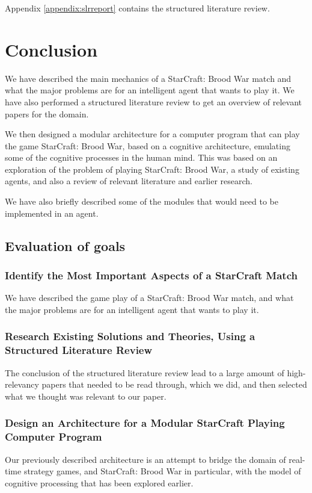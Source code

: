 Appendix \ref{appendix:slrreport} contains the structured literature review.

\section{Conclusion}
We have described the main mechanics of a StarCraft: Brood War match and what
the major problems are for an intelligent agent that wants to play it. We have
also performed a structured literature review to get an overview of relevant
papers for the domain.

We then designed a modular architecture for a computer program that can play the
game StarCraft: Brood War, based on a cognitive architecture, emulating some of
the cognitive processes in the human mind. This was based on an exploration of
the problem of playing StarCraft: Brood War, a study of existing agents, and
also a review of relevant literature and earlier research.

We have also briefly described some of the modules that would need to be
implemented in an agent.

\subsection{Evaluation of goals}
\subsubsection{Identify the Most Important Aspects of a StarCraft Match}
We have described the game play of a StarCraft: Brood War match, and what the
major problems are for an intelligent agent that wants to play it.
\subsubsection{Research Existing Solutions and Theories, Using a Structured
Literature Review}
The conclusion of the structured literature review lead to a large amount of
high-relevancy papers that needed to be read through, which we did, and then
selected what we thought was relevant to our paper.
\subsubsection{Design an Architecture for a Modular StarCraft Playing Computer
Program}
Our previously described architecture is an attempt to bridge the domain of
real-time strategy games, and StarCraft: Brood War in particular, with the
model of cognitive processing that has been explored earlier.


